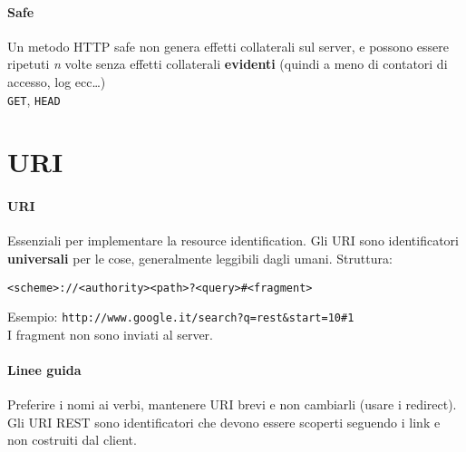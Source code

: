 \documentclass[10pt]{article}
\begin{document}
\paragraph{Safe} Un metodo HTTP safe non genera effetti collaterali sul server, e possono essere ripetuti \textit{n} volte senza effetti collaterali \textbf{evidenti} (quindi a meno di contatori di accesso, log ecc\ldots)\\
\texttt{GET}, \texttt{HEAD}
\section{URI}
\paragraph{URI} Essenziali per implementare la resource identification. Gli URI sono identificatori \textbf{universali} per le cose, generalmente leggibili dagli umani. Struttura:\begin{center}
\texttt{<scheme>://<authority><path>?<query>\#<fragment>}
\end{center}
Esempio: \texttt{http://www.google.it/search?q=rest\&start=10\#1}\\
I fragment non sono inviati al server.
\paragraph{Linee guida} Preferire i nomi ai verbi, mantenere URI brevi e non cambiarli (usare i redirect).\\
Gli URI REST sono identificatori che devono essere scoperti seguendo i link e non costruiti dal client.
\end{document}
